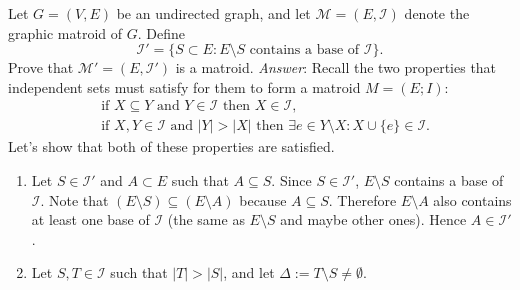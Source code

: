 \documentclass[10pt]{article}
\newenvironment{exercise}[2][Exercise]{\begin{trivlist}
  \item[\hskip \labelsep {\bfseries #1}\hskip \labelsep {\bfseries #2.}]}{\end{trivlist}}
\begin{document}
  
    \newpage
  \begin{exercise}{2a} Let $G = (V, E)$ be an undirected graph, and let $\mathcal{M} = (E, \mathcal{I})$ denote the graphic matroid of $G$. Define 
  \begin{displaymath}
  \mathcal{I}'= \{ S \subset E : E \setminus S \mbox{ contains a base of } \mathcal{I} \}.
  \end{displaymath}
Prove that $\mathcal{M}' = (E, \mathcal{I}')$ is a matroid.
 \newline
 \emph{Answer}: Recall the two properties that independent sets must satisfy for them to form a matroid $M=(E;I)$:
 \begin{align}
 & \mbox{if } X \subseteq Y \mbox{ and } Y \in \mathcal{I} \mbox{ then } X \in \mathcal{I}, \label{eq:p1}\\
 & \mbox{if } X, Y \in \mathcal{I} \mbox{ and } |Y| > |X| \mbox{ then } \exists e \in Y \setminus X : X \cup \{e\} \in \mathcal{I}. \label{eq:p2}
 \end{align}
Let's show that both of these properties are satisfied. 
\begin{enumerate}
\item Let $S \in \mathcal{I}'$ and $A \subset E$ such that $A \subseteq S$. Since $S \in \mathcal{I}'$, $E \setminus S$ contains a base of $\mathcal{I}$. Note that $(E \setminus S) \subseteq (E \setminus A)$ because $A \subseteq S$. Therefore $E \setminus A$ also contains at least one base of $\mathcal{I}$ (the same as $E \setminus S$ and maybe other ones). Hence $A \in \mathcal{I}'$.
\item Let $S,T \in \mathcal{I}$ such that $|T| > |S|$, and let $\Delta := T\setminus S \neq \emptyset$. 


\end{enumerate}
\end{exercise}
\end{document}
